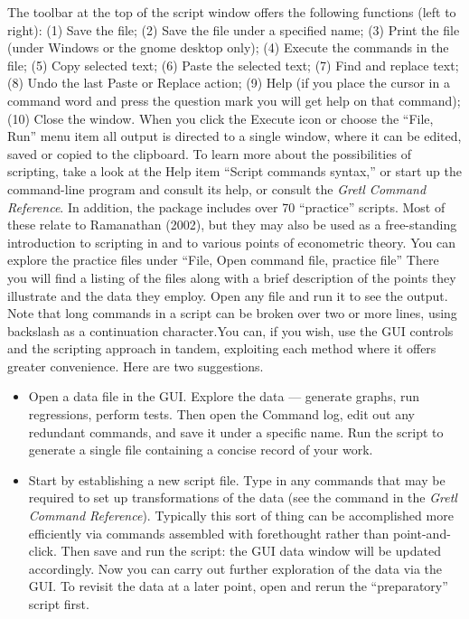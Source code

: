 The toolbar at the top of the script window offers the
      following functions (left to right): (1) Save the file; (2) Save
      the file under a specified name; (3) Print the file (under
      Windows or the gnome desktop only); (4) Execute the commands in
      the file; (5) Copy selected text; (6) Paste the selected text;
      (7) Find and replace text; (8) Undo the last Paste or Replace
      action; (9) Help (if you place the cursor in a command word and
      press the question mark you will get help on that command); (10)
      Close the window.
    When you click the Execute icon or choose the ``File,
	Run'' menu item all output is directed to a single
      window, where it can be edited, saved or copied to the
      clipboard.
    To learn more about the possibilities of scripting, take a look at the
       Help item ``Script commands
      syntax,'' or start up the command-line program
       and consult its help, or consult the
      \emph{Gretl Command Reference}. In addition, the
       package includes over 70
      ``practice'' scripts.  Most of these relate to Ramanathan
      (2002), but they may also be used as a free-standing introduction to
      scripting in  and to various points of
      econometric theory.  You can explore the practice files under ``File,
      Open command file, practice file'' There you will find a listing of
      the files along with a brief description of the points they illustrate and
      the data they employ.  Open any file and run it to see the output.
    Note that long commands in a script can be broken over two
      or more lines, using backslash as a continuation
      character.You can, if you wish, use the GUI controls and the scripting
      approach in tandem, exploiting each method where it offers
      greater convenience.  Here are two suggestions.
\begin{itemize}
\item Open a data file in the GUI.  Explore the data
	  --- generate graphs, run regressions, perform tests.
	  Then open the Command log, edit out any redundant commands,
	  and save it under a specific name. Run the script to
	  generate a single file containing a concise record of your
	  work.
\item Start by establishing a new script file.  Type in any
	  commands that may be required to set up transformations of the data
	  (see the  command in the \emph{Gretl
	    Command Reference}). Typically this sort of thing can be
	  accomplished more efficiently via commands assembled with forethought
	  rather than point-and-click. Then save and run the script: the GUI
	  data window will be updated accordingly. Now you can carry out further
	  exploration of the data via the GUI. To revisit the data at a later
	  point, open and rerun the ``preparatory'' script
	  first.
\end{itemize}



